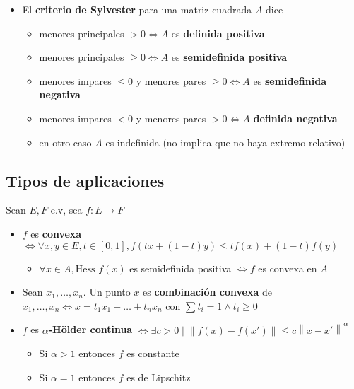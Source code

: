 \documentclass[a4paper,twocolumn]{extarticle}
\newcommand{\norma}[1]{\left\lVert#1\right\rVert}
\newcommand{\hess}{\text{Hess }}
\begin{document}
\begin{itemize}
	\item El \textbf{criterio de Sylvester} para una matriz cuadrada $A$ dice
	\begin{itemize}
		\item menores principales $> 0 \iff A$ es \textbf{definida positiva}
		\item menores principales $\geq 0 \iff A$ es \textbf{semidefinida positiva}
		\item menores impares $\leq 0$ y menores pares $\geq 0 \iff A$ es \textbf{semidefinida negativa}
		\item menores impares $< 0$ y menores pares $> 0 \iff A$ \textbf{definida negativa}
		\item en otro caso $A$ es indefinida (no implica que no haya extremo relativo)
	\end{itemize}
\end{itemize}

\subsection{Tipos de aplicaciones}

Sean $E,F$ e.v, sea $f: E \to F$
\begin{itemize}
	\item $f$ es \textbf{convexa} $\iff \forall x,y \in E, t \in [0,1], f(tx + (1-t)y) \leq tf(x) + (1-t)f(y)$
	\begin{itemize}
		\item $\forall x \in A, \hess f (x)$ es semidefinida positiva $\iff f$ es convexa en $A$
	\end{itemize}
	\item Sean $x_1, \dots, x_n$. Un punto $x$ es \textbf{combinación convexa} de $x_1, \dots, x_n \iff x = t_1x_1 + \dots + t_nx_n$ con $\sum t_i = 1 \land t_i \geq 0$
	\item $f$ es $\alpha$\textbf{-Hölder continua} $\iff \exists c > 0 \mid \norma{f(x) - f(x')} \leq c \norma{x - x'}^\alpha$
	\begin{itemize}
		\item Si $\alpha > 1$ entonces $f$ es constante
		\item Si $\alpha = 1$ entonces $f$ es de Lipschitz
	\end{itemize}
\end{itemize}
\end{document}
